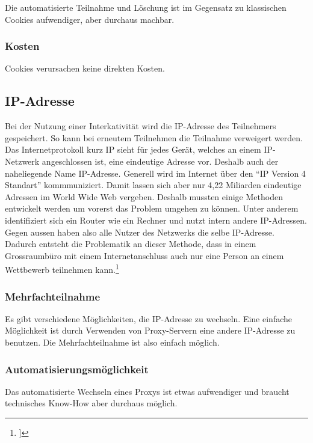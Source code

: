 Die automatisierte Teilnahme und Löschung ist im Gegensatz zu
klassischen Cookies aufwendiger, aber durchaus machbar.

\subsubsection{Kosten}\label{kosten-1}

Cookies verursachen keine direkten Kosten.

\subsection{IP-Adresse}\label{ip-adresse}

Bei der Nutzung einer Interkativität wird die IP-Adresse des Teilnehmers
gespeichert. So kann bei erneutem Teilnehmen die Teilnahme verweigert
werden. Das Internetprotokoll kurz IP sieht für jedes Gerät, welches an
einem IP-Netzwerk angeschlossen ist, eine eindeutige Adresse vor.
Deshalb auch der naheliegende Name IP-Adresse. Generell wird im Internet
über den ``IP Version 4 Standart'' kommmuniziert. Damit lassen sich aber
nur 4,22 Miliarden eindeutige Adressen im World Wide Web vergeben.
Deshalb mussten einige Methoden entwickelt werden um vorerst das Problem
umgehen zu können. Unter anderem identifiziert sich ein Router wie ein
Rechner und nutzt intern andere IP-Adressen. Gegen aussen haben also
alle Nutzer des Netzwerks die selbe IP-Adresse. Dadurch entsteht die
Problematik an dieser Methode, dass in einem Grossraumbüro mit einem
Internetanschluss auch nur eine Person an einem Wettbewerb teilnehmen
kann.\footnote{\autocite{pclexikon-ip}{]}}

\subsubsection{Mehrfachteilnahme}\label{mehrfachteilnahme-1}

Es gibt verschiedene Möglichkeiten, die IP-Adresse zu wechseln. Eine
einfache Möglichkeit ist durch Verwenden von Proxy-Servern eine andere
IP-Adresse zu benutzen. Die Mehrfachteilnahme ist also einfach möglich.

\subsubsection{Automatisierungsmöglichkeit}\label{automatisierungsmuxf6glichkeit-1}

Das automatisierte Wechseln eines Proxys ist etwas aufwendiger und
braucht technisches Know-How aber durchaus möglich.

